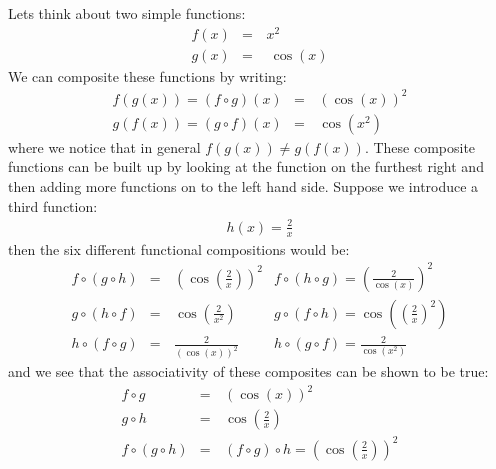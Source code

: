 \documentclass[letterpaper,10pt,english]{jupyterBook}
\begin{document}
\sphinxAtStartPar
Lets think about two simple functions:
\begin{equation*}
\begin{split}f(x) &=&\, x^2\\
g(x) &=&\,\ \cos(x)\end{split}
\end{equation*}
\sphinxAtStartPar
We can composite these functions by writing:
\begin{equation*}
\begin{split}f(g(x)) = (f \circ g)(x) &=&\, (\cos(x))^2 \\
g(f(x)) = (g \circ f)(x) &=&\, \cos(x^2)\end{split}
\end{equation*}
\sphinxAtStartPar
where we notice that in general \(f(g(x)) \neq g(f(x))\).  These composite functions can be built up by looking at the function on the furthest right and
then adding more functions on to the left hand side.  Suppose we introduce a third function:
\begin{equation*}
\begin{split}h(x) = \frac{2}{x}\end{split}
\end{equation*}
\sphinxAtStartPar
then the six different functional compositions would be:
\begin{equation*}
\begin{split}f \circ (g \circ h) &=&\, \left( \cos \left( \frac{2}{x} \right) \right)^2 & f \circ (h \circ g) = \left( \frac{2}{\cos(x)} \right)^2 \\ 
g \circ (h \circ f) &=&\, \cos \left( \frac{2}{x^2} \right) & g \circ (f \circ h) = \cos \left( \left( \frac{2}{x}\right)^2  \right) \\ 
h \circ (f \circ g) &=&\, \frac{2}{\left( \cos (x) \right)^2 } & h \circ (g \circ f) = \frac{2}{\cos(x^2)}\end{split}
\end{equation*}
\sphinxAtStartPar
and we see that the associativity of these composites can be shown to be true:
\begin{equation*}
\begin{split} f\circ g &=&\, (\cos(x))^2\\
 g \circ h &=&\, \cos\left(\frac{2}{x}\right) \\ 
f \circ (g \circ h) &=&\, (f \circ g) \circ h = \left( \cos \left( \frac{2}{x} \right) \right)^2\end{split}
\end{equation*}
\end{document}
